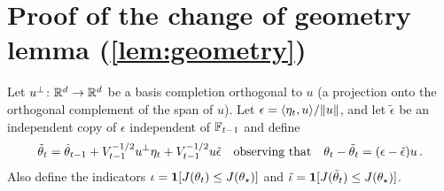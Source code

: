 \section{Proof of the change of geometry lemma (\cref{lem:geometry})}\label{sec:change-of-geometry}

\newcommand{\uorth}{u^{\perp}}

Let $\uorth \colon \Rd \to \Rd$ be a basis completion orthogonal to $u$ (a projection onto the orthogonal complement of the span of $u$). Let $\epsilon = \langle \eta_t, u \rangle / \|u\|$, and let $\tilde{\epsilon}$ be an independent copy of $\epsilon$ independent of $\mathbb{F}_{t-1}$ and define
$$
    \tilde{\theta}_t = \thetapred + \Vt^{-1/2} \uorth \eta_t + \Vt^{-1/2} u \tilde{\epsilon} \spaced{observing that} \thetat - \tilde{\theta}_t = (\epsilon - \tilde{\epsilon})u\,.
$$
Also define the indicators $\iota = \mathbf{1}[J(\theta_t) \leq J(\theta_\star)]$ and $\tilde{\iota} = \mathbf{1}[J(\tilde{\theta}_t) \leq J(\theta_\star)]$. 

